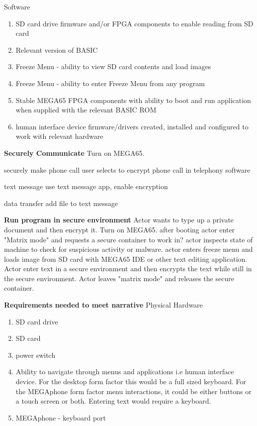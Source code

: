 Software
\begin{enumerate}
\item SD card drive firmware and/or FPGA components to enable reading from SD card
\item Relevant version of BASIC 
\item Freeze Menu - ability to view SD card contents and load images
\item Freeze Menu - ability to enter Freeze Menu from any program
\item Stable MEGA65 FPGA components with ability to boot and run application when supplied with the relevant BASIC ROM
\item human interface device firmware/drivers created, installed and configured to work with relevant hardware
\end{enumerate}

\textbf{Securely Communicate}
Turn on MEGA65.

securely make phone call
user selects to encrypt phone call in telephony software

text message
use text message app, enable encryption

data transfer
add file to text message

\textbf{Run program in secure environment}
Actor wants to type up a private document and then encrypt it. Turn on MEGA65. after booting actor enter "Matrix mode" and requests a secure container to work in? actor inspects state of machine to check for suspicious activity or malware. 
actor enters freeze menu and loads image from SD card with MEGA65 IDE or other text editing application. Actor enter text in a secure environment and then encrypts the text while still in the secure environment. Actor leaves "matrix mode" and releases the secure container.

\textbf{Requirements needed to meet narrative}
Physical Hardware
\begin{enumerate}
\item SD card drive
\item SD card
\item power switch
\item Ability to navigate through menus and applications i.e human interface device. For the desktop form factor this would be a full sized keyboard. For the MEGAphone form factor menu interactions, it could be either buttons or a touch screen or both. Entering text would require a keyboard.
\item MEGAphone - keyboard port
\end{enumerate}

